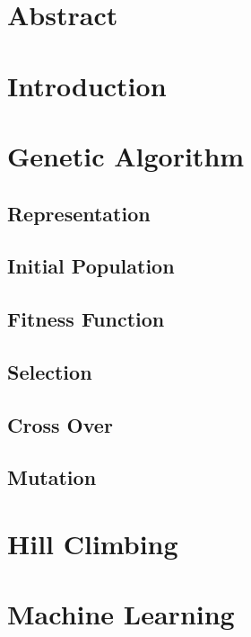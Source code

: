 \documentclass[12pt]{article}
\begin{document}
\maketitle

\pagebreak
\tableofcontents
\pagebreak

\section{Abstract}

\pagebreak

\section{Introduction}

\pagebreak

\section{Genetic Algorithm}

\subsection{Representation}
\subsection{Initial Population}
\subsection{Fitness Function}
\subsection{Selection}
\subsection{Cross Over}
\subsection{Mutation}



\pagebreak

\section{Hill Climbing}

\pagebreak

\section{Machine Learning}
\end{document}
